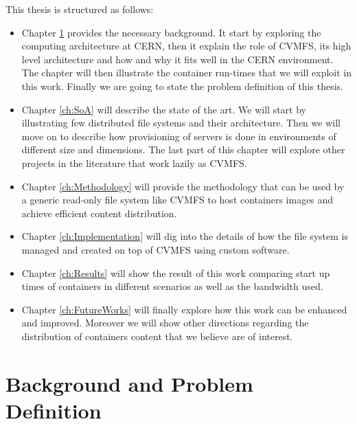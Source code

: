 This thesis is structured as follows:
\begin{itemize} 
        \item Chapter \ref{ch:background} provides the necessary background. It
                start by exploring the computing architecture at CERN, then it
                explain the role of CVMFS, its high level architecture and how
                and why it fits well in the CERN environment. The chapter will
                then illustrate the container run-times that we will exploit in
                this work. Finally we are going to state the problem definition
                of this thesis.  
        \item Chapter \ref{ch:SoA} will describe the state of the art. We will
                start by illustrating few distributed file systems and their
                architecture. Then we will move on to describe how provisioning
                of servers is done in environments of different size and
                dimensions.  The last part of this chapter will explore other
                projects in the literature that work lazily as CVMFS.

        \item Chapter \ref{ch:Methodology} will provide the methodology that
                can be used by a generic read-only file system like CVMFS to
                host containers images and achieve efficient content
                distribution.

        \item Chapter \ref{ch:Implementation} will dig into the details of how
                the file system is managed and created on top of CVMFS using
                custom software.

        \item Chapter \ref{ch:Results} will show the result of this work
                comparing start up times of containers in different scenarios
                as well as the bandwidth used.

        \item Chapter \ref{ch:FutureWorks} will finally explore how this work
                can be enhanced and improved. Moreover we will show other
                directions regarding the distribution of containers content
                that we believe are of interest. 
\end{itemize}

\chapter{Background and Problem Definition}\label{ch:background}

